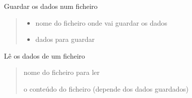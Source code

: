 \documentclass[letterpaper,10pt,portuges]{sphinxmanual}
\begin{document}
\begin{fulllineitems}
\label{\detokenize{io_ficheiros:io_ficheiros.guardar_ficheiro}}
\pysigstartsignatures
{}
\pysigstopsignatures
\sphinxAtStartPar
Guardar os dados num ficheiro
\begin{quote}\begin{description}
\begin{itemize}
\item {} 
\sphinxAtStartPar
{} \textendash{} nome do ficheiro onde vai guardar os dados

\item {} 
\sphinxAtStartPar
{} \textendash{} dados para guardar

\end{itemize}

\end{description}\end{quote}

\end{fulllineitems}


\begin{fulllineitems}
\label{\detokenize{io_ficheiros:io_ficheiros.ler_ficheiro}}
\pysigstartsignatures
{}
\pysigstopsignatures
\sphinxAtStartPar
Lê os dados de um ficheiro
\begin{quote}\begin{description}
\sphinxAtStartPar
{} \textendash{} nome do ficheiro para ler

\sphinxAtStartPar
o conteúdo do ficheiro (depende dos dados guardados)

\end{description}\end{quote}

\end{fulllineitems}


\sphinxstepscope
\end{document}
